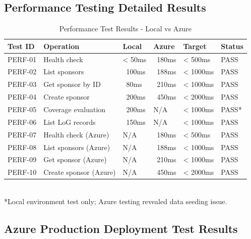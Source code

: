 \subsection{Performance Testing Detailed Results}

\begin{table}[h!]
\centering
\caption{Performance Test Results - Local vs Azure}
\label{tab:appendix_performance}
\renewcommand{\arraystretch}{1.15}
\setlength{\tabcolsep}{4pt}
\begin{tabularx}{\textwidth}{@{}
  >{\RaggedLeft\arraybackslash}p{1.2cm}
  >{\RaggedRight\arraybackslash}p{3.5cm}
  >{\RaggedLeft\arraybackslash}p{1.8cm}
  >{\RaggedLeft\arraybackslash}p{1.8cm}
  >{\RaggedLeft\arraybackslash}p{1.8cm}
  >{\RaggedLeft\arraybackslash}p{1.5cm}
@{}}
\toprule
\textbf{Test ID} & \textbf{Operation} & \textbf{Local} & \textbf{Azure} & \textbf{Target} & \textbf{Status} \\
\midrule
PERF-01 & Health check & < 50ms & ~180ms & < 500ms & PASS \\
PERF-02 & List sponsors & ~100ms & ~188ms & < 1000ms & PASS \\
PERF-03 & Get sponsor by ID & ~80ms & ~210ms & < 1000ms & PASS \\
PERF-04 & Create sponsor & ~200ms & ~450ms & < 2000ms & PASS \\
PERF-05 & Coverage evaluation & ~200ms & N/A & < 1000ms & PASS* \\
PERF-06 & List LoG records & ~150ms & N/A & < 1000ms & PASS \\
PERF-07 & Health check (Azure) & N/A & ~180ms & < 500ms & PASS \\
PERF-08 & List sponsors (Azure) & N/A & ~188ms & < 1000ms & PASS \\
PERF-09 & Get sponsor (Azure) & N/A & ~210ms & < 1000ms & PASS \\
PERF-10 & Create sponsor (Azure) & N/A & ~450ms & < 2000ms & PASS \\
\bottomrule
\end{tabularx}
\\
*Local environment test only; Azure testing revealed data seeding issue.
\end{table}

\subsection{Azure Production Deployment Test Results}

